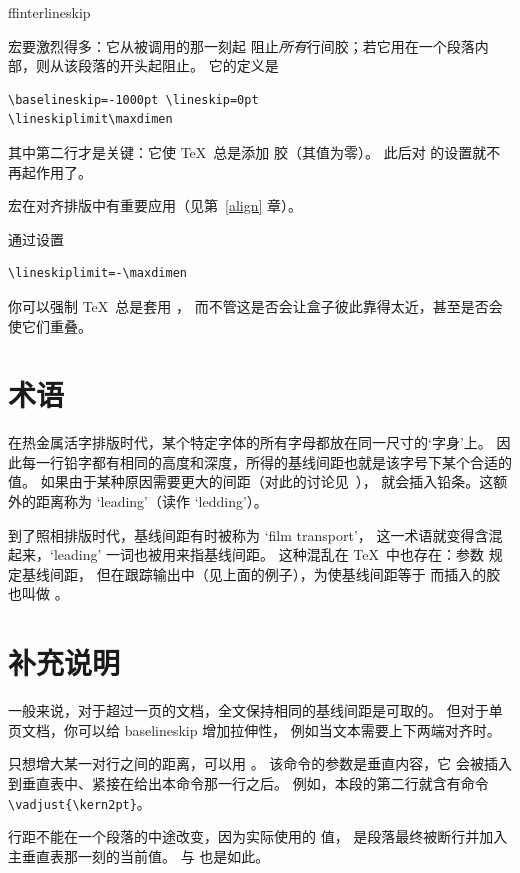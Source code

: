 \documentclass[a4paper]{rapport3}
\makeatletter
\def\cstoidx#1\par{\index{#1@\cs{#1}}}
\def\csidx#1{\cstoidx #1\par\cs{#1}}
\makeatother
\begin{document}
\csidx{offinterlineskip} 宏要激烈得多：它从被调用的那一刻起
阻止{\sl 所有\/}行间胶；若它用在一个段落内部，则从该段落的开头起阻止。
它的定义是
\begin{verbatim}
\baselineskip=-1000pt \lineskip=0pt 
\lineskiplimit\maxdimen
\end{verbatim}
其中第二行才是关键：它使 \TeX\ 总是添加  胶（其值为零）。
此后对  的设置就不再起作用了。

 宏在对齐排版中有重要应用（见第~\ref{align} 章）。

通过设置\begin{verbatim}
\lineskiplimit=-\maxdimen
\end{verbatim}
你可以强制 \TeX\ 总是套用 ，
而不管这是否会让盒子彼此靠得太近，甚至是否会使它们重叠。

\section{术语}

在热金属活字排版时代，某个特定字体的所有字母都放在同一尺寸的`字身'上。
因此每一行铅字都有相同的高度和深度，所得的基线间距也就是该字号下某个合适的值。
如果由于某种原因需要更大的间距（对此的讨论见~\cite{White:line}），
就会插入铅条。这额外的距离称为 `leading'（读作 `ledding'）。

到了照相排版时代，基线间距有时被称为 `film transport'，
这一术语就变得含混起来，`leading' 一词也被用来指基线间距。
这种混乱在 \TeX\ 中也存在：参数  规定基线间距，
但在跟踪输出中（见上面的例子），为使基线间距等于 
而插入的胶也叫做 。

\section{补充说明}

一般来说，对于超过一页的文档，全文保持相同的基线间距是可取的。
但对于单页文档，你可以给 baselineskip 增加拉伸性，
例如当文本需要上下两端对齐时。

只想增大某一对行之间的距离，可以用 。
该命令的参数是垂直内容，它\vadjust{\kern2pt}
会被插入到垂直表中、紧接在给出本命令那一行之后。
例如，本段的第二行就含有命令 \verb-\vadjust{\kern2pt}-。

行距不能在一个段落的中途改变，因为实际使用的  值，
是段落最终被断行并加入主垂直表那一刻的当前值。
 与  也是如此。
\end{document}
